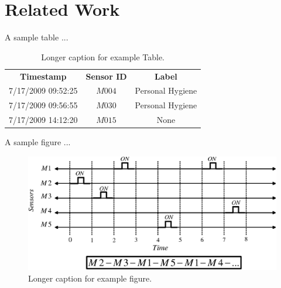 \chapter{Related Work}
\label{chapter:Related}

A sample table ...

\begin{table}[htb]
\centering
\setlength{\extrarowheight}{4pt}
\begin{tabular}{|c|c|c|}
\hline
\rowcolor[gray]{0.9}
\textbf{Timestamp}  & \textbf{Sensor ID}  & \textbf{Label} \\
7/17/2009 09:52:25 & $M004$ & Personal Hygiene\\
7/17/2009 09:56:55 & $M030$ & Personal Hygiene \\
7/17/2009 14:12:20 & $M015$ &None\\
\hline
\end{tabular}
\caption[Example Table.]{Longer caption for example Table.}
\label{Tbl:Ch2-SensorData}
\end{table}


A sample figure ...

\begin{figure}[htb]
  \begin{center}
    \includegraphics[scale=0.7]{./../chapter2/Figures/Stream.eps}
  \end{center}
  \caption[Example Figure]{Longer caption for example figure.}
  \label{fig:Ch1-Stream}
\end{figure} 
